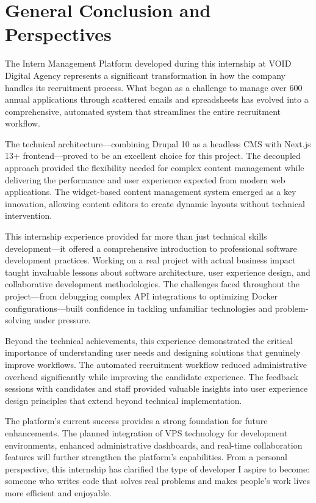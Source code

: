\chapter*{General Conclusion and Perspectives}
\label{chap:conclusion}

The Intern Management Platform developed during this internship at VOID Digital Agency represents a significant transformation in how the company handles its recruitment process. What began as a challenge to manage over 600 annual applications through scattered emails and spreadsheets has evolved into a comprehensive, automated system that streamlines the entire recruitment workflow.

\medskip
\noindent
The technical architecture—combining Drupal 10 as a headless CMS with Next.js 13+ frontend—proved to be an excellent choice for this project. The decoupled approach provided the flexibility needed for complex content management while delivering the performance and user experience expected from modern web applications. The widget-based content management system emerged as a key innovation, allowing content editors to create dynamic layouts without technical intervention.

\medskip
\noindent
This internship experience provided far more than just technical skills development—it offered a comprehensive introduction to professional software development practices. Working on a real project with actual business impact taught invaluable lessons about software architecture, user experience design, and collaborative development methodologies. The challenges faced throughout the project—from debugging complex API integrations to optimizing Docker configurations—built confidence in tackling unfamiliar technologies and problem-solving under pressure.

\medskip
\noindent
Beyond the technical achievements, this experience demonstrated the critical importance of understanding user needs and designing solutions that genuinely improve workflows. The automated recruitment workflow reduced administrative overhead significantly while improving the candidate experience. The feedback sessions with candidates and staff provided valuable insights into user experience design principles that extend beyond technical implementation.

\medskip
\noindent
The platform's current success provides a strong foundation for future enhancements. The planned integration of VPS technology for development environments, enhanced administrative dashboards, and real-time collaboration features will further strengthen the platform's capabilities. From a personal perspective, this internship has clarified the type of developer I aspire to become: someone who writes code that solves real problems and makes people's work lives more efficient and enjoyable.

